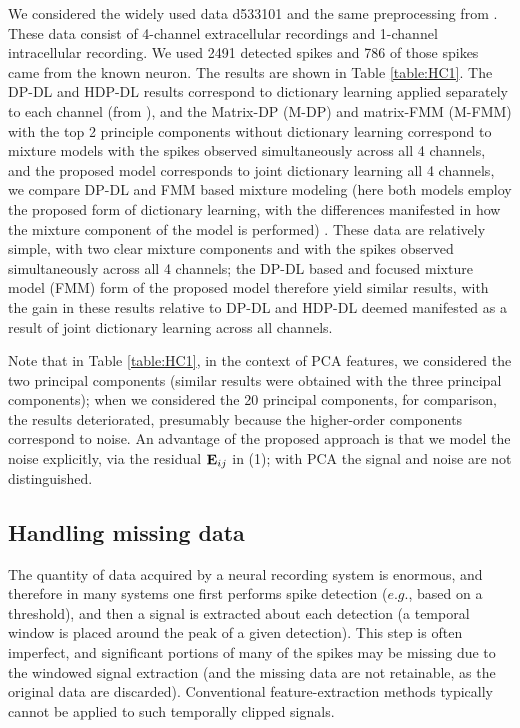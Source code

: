 \documentclass[journal]{IEEEtran}
\begin{document}
We considered
the widely used data d533101 and the same
preprocessing from \cite{Calabrese2010}.
  These data consist of 4-channel extracellular recordings and 1-channel
  intracellular recording.  We used 2491 detected spikes and 786 of those
  spikes came from the known neuron. The results are shown in Table \ref{table:HC1}.
   The DP-DL and HDP-DL results correspond to dictionary learning applied separately to each channel (from \cite{Bo2011}), and the Matrix-DP (M-DP) and matrix-FMM (M-FMM) with the top 2 principle components without dictionary learning correspond to mixture models with the spikes observed simultaneously across all 4 channels, and the proposed model corresponds to joint dictionary learning all 4 channels, we compare DP-DL and FMM based mixture modeling (here both models employ the proposed form of dictionary learning, with the differences manifested in how the mixture component of the model is performed) . These data are relatively simple, with two clear mixture components and with the spikes observed simultaneously across all 4 channels; the DP-DL based and focused mixture model (FMM) form of the proposed model therefore yield similar results, with the gain in these results relative to DP-DL and HDP-DL deemed manifested as a result of joint dictionary learning across all channels. 
   
Note that in Table \ref{table:HC1}, in the context of PCA features, we considered the two principal components (similar results were obtained with the three principal components); when we considered the 20 principal components, for comparison, the results deteriorated, presumably because the higher-order components correspond to noise. An advantage of the proposed approach is that we model the noise explicitly, via the residual ${\mathbf E}_{ij}$ in (1); with PCA the signal and noise are not distinguished.

\subsection{Handling missing data}

The quantity of data acquired by a neural recording system is enormous, and therefore in many systems one first performs spike detection ($e.g.$, based on a threshold), and then a signal is extracted about each detection (a temporal window is placed around the peak of a given detection). This step is often imperfect, and significant portions of many of the spikes may be missing due to the windowed signal extraction (and the missing data are not retainable, as the original data are discarded). Conventional feature-extraction methods typically cannot be applied to such temporally clipped signals.
\end{document}

